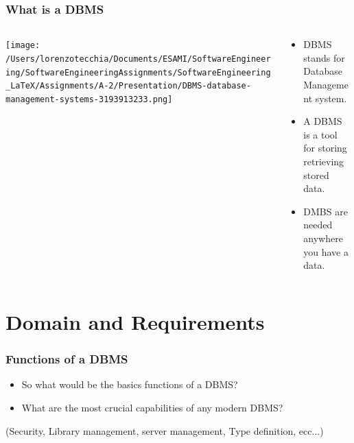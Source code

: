 \documentclass{beamer}
\begin{document}
\begin{frame}
	\frametitle{What is a DBMS}
	\begin{columns}
	\begin{column}{0.4\textwidth}
		\texttt{[image: /Users/lorenzotecchia/Documents/ESAMI/SoftwareEngineering/SoftwareEngineeringAssignments/SoftwareEngineering\_LaTeX/Assignments/A-2/Presentation/DBMS-database-management-systems-3193913233.png]}
	\end{column}
	
	\begin{column}{0.4\textwidth}
	\begin{itemize}
		\item DBMS stands for Database Management system. 
		\item A DBMS is a tool for storing retrieving stored data.
		\item DMBS are needed anywhere you have a data.		
	\end{itemize}
			 
	\end{column}
	
	\end{columns}


\end{frame}

\section{Domain and Requirements}
\begin{frame}
	\frametitle{Functions of a DBMS}
	\begin{itemize}
		\item So what would be the basics functions of a DBMS?
		\item What are the most crucial capabilities of any modern DBMS?
	\end{itemize}
	  (Security, Library management, server management, Type definition, ecc...)
\end{frame}
\end{document}

